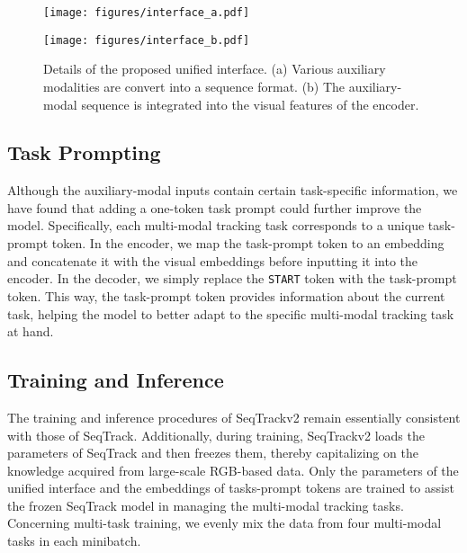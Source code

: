 \begin{figure}[t]
\begin{center}
\texttt{[image: figures/interface\_a.pdf]}
\end{center}
\begin{center}
\texttt{[image: figures/interface\_b.pdf]}
\end{center}
    \vspace{-3mm}
   \caption{
   Details of the proposed unified interface. (a) Various auxiliary modalities are convert into a sequence format. (b) The auxiliary-modal sequence is integrated into the visual features of the encoder.} 
       \vspace{-1mm}
\label{fig:interface}
\end{figure}

\subsection{Task Prompting}
\label{sec-taskprompt}

Although the auxiliary-modal inputs contain certain task-specific information, we have found that adding a one-token task prompt could further improve the model. Specifically, each multi-modal tracking task corresponds to a unique task-prompt token. In the encoder, we map the task-prompt token to an embedding and concatenate it with the visual embeddings before inputting it into the encoder. In the decoder, we simply replace the \texttt{START} token with the task-prompt token. This way, the task-prompt token provides information about the current task, helping the model to better adapt to the specific multi-modal tracking task at hand.

\subsection{Training and Inference}
\label{sec-train}
The training and inference  procedures of SeqTrackv2 remain essentially consistent with those of SeqTrack. Additionally, during training, SeqTrackv2 loads the parameters of SeqTrack and then freezes them, thereby capitalizing on the knowledge acquired from large-scale RGB-based data. Only the parameters of the unified interface and the embeddings of tasks-prompt tokens are trained to assist the frozen SeqTrack model in managing the multi-modal tracking tasks. Concerning multi-task training, we evenly mix the data from four multi-modal tasks  in each minibatch.

